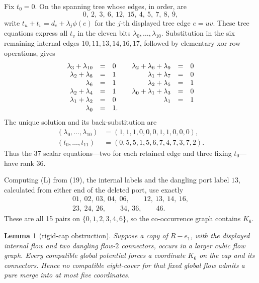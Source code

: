 \documentclass[11pt]{article}
\newtheorem{lemma}[theorem]{Lemma}
\theoremstyle{definition}
\theoremstyle{remark}
\begin{document}
Fix \(t_0=0\).  On the spanning tree whose edges, in order, are
\[
 0,\ 2,\ 3,\ 6,\ 12,\ 15,\ 4,\ 5,\ 7,\ 8,\ 9,
\]
write \(t_u+t_v=d_e+\lambda_j\phi(e)\) for the \(j\)-th displayed tree
edge \(e=uv\).  These tree equations express all \(t_v\) in the eleven
bits \(\lambda_0,\ldots,\lambda_{10}\).  Substitution in the six
remaining internal edges \(10,11,13,14,16,17\), followed by elementary
xor row operations, gives
\[
\begin{array}{rcl@{\qquad}rcl}
\lambda_3+\lambda_{10}&=&0&
\lambda_2+\lambda_6+\lambda_9&=&0\\
\lambda_2+\lambda_8&=&1&
\lambda_1+\lambda_7&=&0\\
\lambda_6&=&1&
\lambda_2+\lambda_5&=&1\\
\lambda_2+\lambda_4&=&1&
\lambda_0+\lambda_1+\lambda_3&=&0\\
\lambda_1+\lambda_2&=&0&
\lambda_1&=&1\\
\lambda_0&=&1.&&&
\end{array}
\]
The unique solution and its back-substitution are
\[
\begin{split}
(\lambda_0,\ldots,\lambda_{10})
  &=(1,1,1,0,0,0,1,1,0,0,0),\\
(t_0,\ldots,t_{11})
  &=(0,5,5,1,5,6,7,4,7,3,7,2).
\end{split}                                                       \tag{19}
\]
Thus the 37 scalar equations---two for each retained edge and three
fixing \(t_0\)---have rank 36.

Computing (L) from (19), the internal labels and the dangling port label
\(13\), calculated from either end of the deleted port, use exactly
\[
\begin{gathered}
01,\ 02,\ 03,\ 04,\ 06,\qquad
12,\ 13,\ 14,\ 16,\\
23,\ 24,\ 26,\qquad
34,\ 36,\qquad
46.
\end{gathered}                                                    \tag{20}
\]
These are all 15 pairs on \(\{0,1,2,3,4,6\}\), so the co-occurrence
graph contains \(K_6\).

\begin{lemma}[rigid-cap obstruction]\label{lem:rigid-cap}
Suppose a copy of \(R-e_1\), with the displayed internal flow and two
dangling flow-\(2\) connectors, occurs in a larger cubic flow graph.
Every compatible global potential forces a coordinate \(K_6\) on the
cap and its connectors.  Hence no compatible eight-cover for that fixed
global flow admits a pure merge into at most five coordinates.
\end{lemma}
\end{document}
